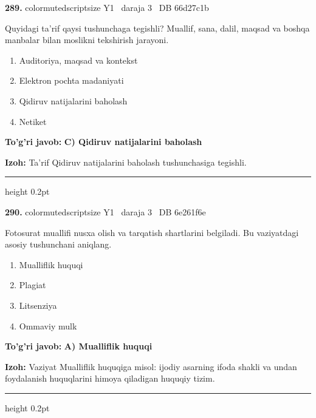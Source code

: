 \documentclass[10pt,a4paper,oneside]{article}
\begin{document}
\noindent\textbf{\color{ink}289.}  {color{muted}scriptsize Y1 \textbullet\ daraja 3 \textbullet\ DB 66d27c1b}
\par
Quyidagi ta'rif qaysi tushunchaga tegishli? Muallif, sana, dalil, maqsad va boshqa manbalar bilan moslikni tekshirish jarayoni.
\begin{enumerate}[label=\Alph*),leftmargin=9mm]
\item Auditoriya, maqsad va kontekst
\item Elektron pochta madaniyati
\item Qidiruv natijalarini baholash
\item Netiket
\end{enumerate}
\begin{tcolorbox}[enhanced,breakable,colback=teal!4,colframe=teal!50!black,boxrule=0.5pt,arc=1.1mm,left=3mm,right=3mm,top=1.7mm,bottom=1.7mm,before skip=2mm,after skip=2mm]
\textbf{\color{teal}To'g'ri javob:} \textbf{C) Qidiruv natijalarini baholash}
\par\smallskip
\textbf{Izoh:} Ta'rif Qidiruv natijalarini baholash tushunchasiga tegishli.
\end{tcolorbox}
\vspace{2mm}\hrule height 0.2pt \vspace{3mm}

\noindent\textbf{\color{ink}290.}  {color{muted}scriptsize Y1 \textbullet\ daraja 3 \textbullet\ DB 6e261f6e}
\par
Fotosurat muallifi nusxa olish va tarqatish shartlarini belgiladi. Bu vaziyatdagi asosiy tushunchani aniqlang.
\begin{enumerate}[label=\Alph*),leftmargin=9mm]
\item Mualliflik huquqi
\item Plagiat
\item Litsenziya
\item Ommaviy mulk
\end{enumerate}
\begin{tcolorbox}[enhanced,breakable,colback=teal!4,colframe=teal!50!black,boxrule=0.5pt,arc=1.1mm,left=3mm,right=3mm,top=1.7mm,bottom=1.7mm,before skip=2mm,after skip=2mm]
\textbf{\color{teal}To'g'ri javob:} \textbf{A) Mualliflik huquqi}
\par\smallskip
\textbf{Izoh:} Vaziyat Mualliflik huquqiga misol: ijodiy asarning ifoda shakli va undan foydalanish huquqlarini himoya qiladigan huquqiy tizim.
\end{tcolorbox}
\vspace{2mm}\hrule height 0.2pt \vspace{3mm}
\end{document}
